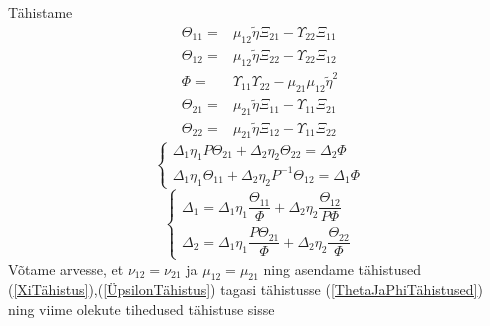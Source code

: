\documentclass[class=article, crop=false]{standalone}
\begin{document}
Tähistame
\begin{equation}\label{ThetaJaPhiTähistused}
	\begin{split}
		\Theta_{11} = & \mu_{12} \tilde{ \eta} \Xi_{21} - \Upsilon_{22} \Xi_{11} \\
		\Theta_{12} = & \mu_{12} \tilde{ \eta} \Xi_{22} - \Upsilon_{22} \Xi_{12} \\
		\Phi = & \Upsilon_{11} \Upsilon_{22} - \mu_{21} \mu_{12} \tilde{ \eta}^{2} \\
		\Theta_{21} = & \mu_{21} \tilde{ \eta} \Xi_{11} - \Upsilon_{11} \Xi_{21} \\
		\Theta_{22} = & \mu_{21} \tilde{ \eta} \Xi_{12} - \Upsilon_{11} \Xi_{22}
	\end{split}
\end{equation}
\begin{equation}\label{key}
	\begin{cases}
		\Delta_{1} \eta_{ 1} P \Theta_{21} + \Delta_{2} \eta_{ 2} \Theta_{22} = \Delta_{2} \Phi \\
		\Delta_{1} \eta_{ 1} \Theta_{11} + \Delta_{2} \eta_{ 2} P^{-1} \Theta_{12} = \Delta_{1} \Phi
	\end{cases}
\end{equation}
\begin{equation}\label{key}
	\begin{cases}
		\Delta_{1} = \Delta_{1} \eta_{ 1} \dfrac{ \Theta_{11}}{ \Phi} + \Delta_{2} \eta_{ 2} \dfrac{ \Theta_{12}}{P \Phi} \\
		\Delta_{2} = \Delta_{1} \eta_{ 1} \dfrac{ P \Theta_{21}}{ \Phi} + \Delta_{2} \eta_{ 2} \dfrac{ \Theta_{22}}{ \Phi}
	\end{cases}
\end{equation}
Võtame arvesse, et $ \nu_{12} = \nu_{21} $ ja $  \mu_{12} = \mu_{21} $ ning asendame tähistused (\ref{XiTähistus}),(\ref{ÜpsilonTähistus}) tagasi tähistusse (\ref{ThetaJaPhiTähistused}) ning viime olekute tihedused tähistuse sisse
\end{document}
